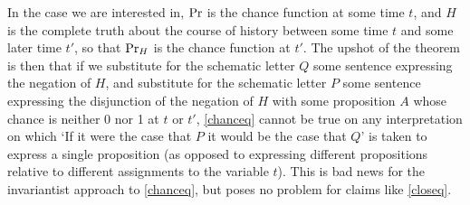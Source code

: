 \documentclass[If.tex]{subfiles}
\begin{document}
In the case we are interested in, $\operatorname{Pr}$ is the chance function at some time $t$, and $H$ is the complete truth about the course of history between some time $t$ and some later time $t'$, so that $\operatorname{Pr}_H$ is the chance function at $t'$.  The upshot of the theorem is then that if we substitute for the schematic letter $Q$ some sentence expressing the negation of $H$, and substitute for the schematic letter $P$ some sentence expressing the disjunction of the negation of $H$ with some proposition $A$ whose chance is neither 0 nor 1 at $t$ or $t'$, \ref{chanceq} cannot be true on any interpretation on which ‘If it were the case that $P$ it would be the case that $Q$’ is taken to express a single proposition (as opposed to expressing different propositions relative to different assignments to the variable $t$).  This is bad news for the invariantist approach to \ref{chanceq}, but poses no problem for claims like \ref{closeq}.  

\end{document}
